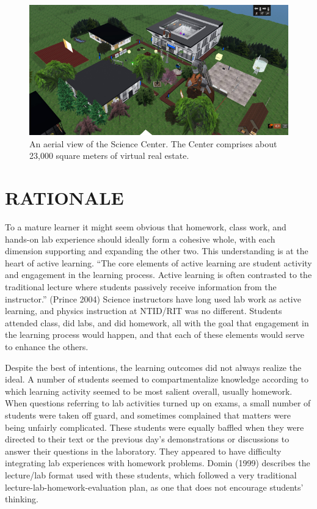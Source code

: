 \documentclass[11.5pt]{sig-alternate} %
\begin{document}
\begin{large}
\begin{figure}[h]
    \centering
    \includegraphics[width=1\linewidth]{fig 2.jpg}
    \caption{An aerial view of the Science Center. The Center comprises about 23,000 square
meters of virtual real estate.}
\end{figure}

\section*{RATIONALE}

To a mature learner it might seem obvious that homework, class work, and hands-on lab experience should ideally form a cohesive whole, with each dimension supporting and expanding the other two. This understanding is at the heart of active learning. “The core elements of active learning are student activity and engagement in the learning process. Active learning is often contrasted to the traditional lecture where students passively receive information from the instructor.” (Prince 2004) Science instructors have long used lab work as active learning, and physics instruction at NTID/RIT was no different. Students attended class, did labs, and did homework, all with the goal that engagement in the learning process would happen, and that each of these elements would serve to enhance the others.

Despite the best of intentions, the learning outcomes did not always realize the ideal. A number of students seemed to compartmentalize knowledge according to which learning activity seemed to be most salient overall, usually homework. When questions referring to lab activities turned up on exams, a small number of students were taken off guard, and sometimes complained that matters were being unfairly complicated. These students were equally baffled when they were directed to their text or the previous day’s demonstrations or discussions to answer their questions in the laboratory. They appeared to have difficulty integrating lab experiences with homework problems. Domin (1999) describes the lecture/lab format used with these students, which followed a very traditional lecture-lab-homework-evaluation plan, as one that does not encourage students’ thinking.


\end{large}
\end{document}
